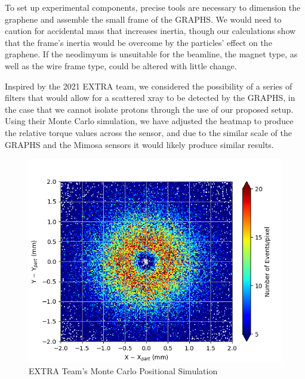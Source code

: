 \documentclass{article}
\begin{document}
To set up experimental components, precise tools are necessary to dimension the graphene and assemble the small frame of the GRAPHS. We would need to caution for accidental mass that increases inertia, though our calculations show that the frame's inertia would be overcome by the particles' effect on the graphene. If the neodimyum is unsuitable for the beamline, the magnet type, as well as the wire frame type, could be altered with little change.

Inspired by the 2021 EXTRA team\cite{EXTRA}, we considered the possibility of a series of filters that would allow for a scattered xray to be detected by the GRAPHS, in the case that we cannot isolate protons through the use of our proposed setup. Using their Monte Carlo simulation, we have adjusted the heatmap to produce the relative torque values across the sensor, and due to the similar scale of the GRAPHS and the Mimosa sensors it would likely produce similar results.

\begin{figure}[H]
\includegraphics[scale=0.5]{extra.png}
\caption{EXTRA Team's Monte Carlo Positional Simulation}
\end{figure}
\end{document}
